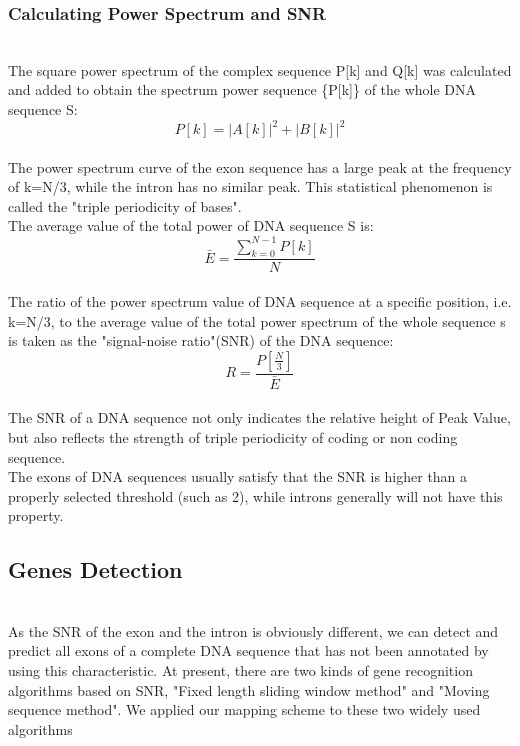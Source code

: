 \documentclass[conference]{IEEEtran}
\begin{document}
\subsubsection{Calculating Power Spectrum and SNR}
~\\\indent The square power spectrum of the complex sequence P[k] and Q[k] was calculated and added to obtain the spectrum power sequence \{P[k]\} of the whole DNA sequence S:
\begin{equation}\label{power-spectrum}
    P[k]=|A[k]|^2+|B[k]|^2
\end{equation}
~\\ \indent The power spectrum curve of the exon sequence has a large peak at the frequency of k=N/3, while the intron has no similar peak. This statistical phenomenon is called the "triple periodicity of bases".
~\\ \indent The average value of the total power of DNA sequence S is:
\begin{equation}\label{power}
    \bar{E}=\frac{\sum_{k=0}^{N-1}{P[k]}}{N}
\end{equation}
~\\ \indent The ratio of the power spectrum value of DNA sequence at a specific position, i.e. k=N/3, to the average value of the total power spectrum of the whole sequence s is taken as the "signal-noise ratio"(SNR) of the DNA sequence:
\begin{equation}\label{SNR}
    R = \frac{P[\frac{N}{3}]}{\bar{E}}
\end{equation}
~\\ \indent The SNR of a DNA sequence not only indicates the relative height of Peak Value, but also reflects the strength of triple periodicity of coding or non coding sequence.
~\\ \indent The exons of DNA sequences usually satisfy that the SNR is higher than a properly selected threshold (such as 2), while introns generally will not have this property.
~\\
\subsection{Genes Detection}
~\\\indent As the SNR of the exon and the intron is obviously different, we can detect and predict all exons of a complete DNA sequence that has not been annotated by using this characteristic. At present, there are two kinds of gene recognition algorithms based on SNR, "Fixed length sliding window method" and "Moving sequence method". We applied our mapping scheme to these two widely used algorithms
\end{document}

